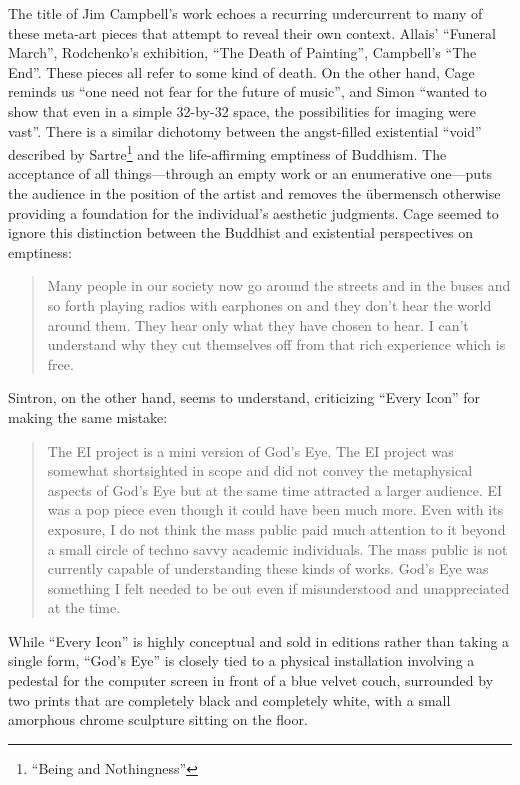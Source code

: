 \documentclass{thesis}
\begin{document}
The title of Jim Campbell's work echoes a recurring undercurrent to many of these meta-art pieces that attempt to reveal their own context. Allais' ``Funeral March'', Rodchenko's exhibition, ``The Death of Painting'', Campbell's ``The End''. These pieces all refer to some kind of death. On the other hand, Cage reminds us ``one need not fear for the future of music'', and Simon ``wanted to show that even in a simple 32-by-32 space, the possibilities for imaging were vast''\cite{matthew_mirapaul_in_1997}. There is a similar dichotomy between the angst-filled existential ``void'' described by Sartre\footnote{``Being and Nothingness''} and the life-affirming emptiness of Buddhism. The acceptance of all things---through an empty work or an enumerative one---puts the audience in the position of the artist and removes the \"ubermensch otherwise providing a foundation for the individual's aesthetic judgments. Cage seemed to ignore this distinction between the Buddhist and existential perspectives on emptiness:
	
\begin{quote}
Many people in our society now go around the streets and in the buses and so forth playing radios with earphones on and they don't hear the world around them. They hear only what they have chosen to hear. I can't understand why they cut themselves off from that rich experience which is free.
\end{quote}

Sintron, on the other hand, seems to understand, criticizing ``Every Icon'' for making the same mistake:\cite{olga_goriunova_and_alexei_shulgin_touching_2003}

	\begin{quote}
	The EI project is a mini version of God's Eye. The EI project was somewhat shortsighted in scope and did not convey the metaphysical aspects of God's Eye but at the same time attracted a larger audience. EI was a pop piece even though it could have been much more. Even with its exposure, I do not think the mass public paid much attention to it beyond a small circle of techno savvy academic individuals. The mass public is not currently capable of understanding these kinds of works. God's Eye was something I felt needed to be out even if misunderstood and unappreciated at the time.
	\end{quote}
	
While ``Every Icon'' is highly conceptual and sold in editions rather than taking a single form, ``God's Eye'' is closely tied to a physical installation involving a pedestal for the computer screen in front of a blue velvet couch, surrounded by two prints that are completely black and completely white, with a small amorphous chrome sculpture sitting on the floor. 
		
\end{document}
